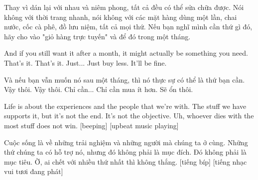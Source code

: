\documentclass[a4paper]{article}
\begin{document}
	\begin{vietnamese-v2}
		Thay vì dán lại với nhau và niêm phong, tất cả đều có thể sửa chữa được.
		Nói không với thời trang nhanh, nói không với các mặt hàng dùng một lần, chai nước, cốc cà phê, đồ lưu niệm, tất cả mọi thứ.
		Nếu bạn nghĩ mình cần thứ gì đó, hãy cho vào "giỏ hàng trực tuyến" và để đó trong một tháng.
	\end{vietnamese-v2}
	
	And if you still want it after a month, it might actually be something you need.
	That's it. That's it. Just... Just buy less.
	It'll be fine.
	
	\begin{vietnamese-v2}
		Và nếu bạn vẫn muốn nó sau một tháng, thì nó thực sự có thể là thứ bạn cần.
		Vậy thôi. Vậy thôi. Chỉ cần... Chỉ cần mua ít hơn.
		Sẽ ổn thôi.
	\end{vietnamese-v2}
	
	
	Life is about the experiences and the people that we're with.
	The stuff we have supports it, but it's not the end.
	It's not the objective.
	Uh, whoever dies with the most stuff does not win.
	[beeping]
	[upbeat music playing]
	
	\begin{vietnamese-v2}
		Cuộc sống là về những trải nghiệm và những người mà chúng ta ở cùng.
		Những thứ chúng ta có hỗ trợ nó, nhưng đó không phải là mục đích.
		Đó không phải là mục tiêu.
		Ờ, ai chết với nhiều thứ nhất thì không thắng.
		[tiếng bíp]
		[tiếng nhạc vui tươi đang phát]
	\end{vietnamese-v2}

	
\end{document}
